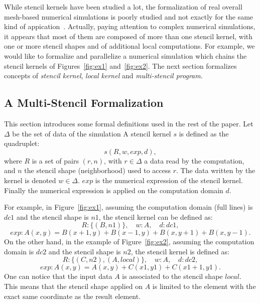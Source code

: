 While stencil kernels have been studied a lot, the formalization of real overall mesh-based numerical simulations is poorly studied and not exactly for the same kind of appication~\cite{Ragan-Kelley:2013:HLC:2491956.2462176}. Actually, paying attention to complex numerical simulations, it appears that most of them are composed of more than one stencil kernel, with one or more stencil shapes and of additional local computations. For example, we would like to formalize and parallelize a numerical simulation which chains the stencil kernels of Figures~\ref{fig:ex1} and~\ref{fig:ex2}. The next section formalizes concepts of \emph{stencil kernel}, \emph{local kernel} and \emph{multi-stencil program}.

\subsection{A Multi-Stencil Formalization}
\label{sect:multistencil}
This section introduces some formal definitions used in the rest of the paper.
Let $\Delta$ be the set of data of the simulation
A stencil kernel $s$ is defined as the quadruplet:
\begin{equation} 
s(R,w,exp,d),
\label{eq:st}
\end{equation}
where $R$ is a set of pairs $(r,n)$, with $r \in \Delta$ a data read by the computation, and $n$ the stencil shape (neighborhood) used to access $r$. The data written by the kernel is denoted $w \in \Delta$. $exp$ is the numerical expression of the stencil kernel. Finally the numerical expression is applied on the computation domain $d$.

For example, in Figure~\ref{fig:ex1}, assuming the computation domain (full lines) is $dc1$ and the stencil shape is $n1$, the stencil kernel can be defined as:
\begin{equation*}
R: \{(B,n1)\}, \quad w: A, \quad d: dc1,
\end{equation*}
\begin{equation*}
exp: A(x,y)=B(x+1,y)+B(x-1,y)+B(x,y+1)+B(x,y-1).
\end{equation*}
On the other hand, in the example of Figure~\ref{fig:ex2}, assuming the computation domain is $dc2$ and the stencil shape is $n2$, the stencil kernel is defined as:
\begin{equation*}
R: \{(C,n2),(A,local)\}, \quad w: A, \quad d: dc2,
\end{equation*}
\begin{equation*}
exp: A(x,y)=A(x,y)+C(x1,y1)+C(x1+1,y1).
\end{equation*}
One can notice that the input data $A$ is associated to the stencil shape $local$. This means that the stencil shape applied on $A$ is limited to the element with the exact same coordinate as the result element.

